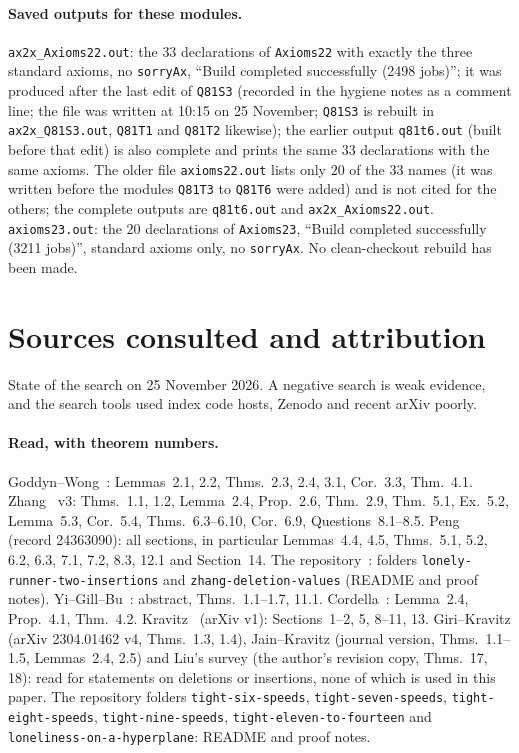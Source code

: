 \documentclass[11pt]{article}
\theoremstyle{definition}
\theoremstyle{remark}
\begin{document}
\paragraph{Saved outputs for these modules.}
\texttt{ax2x\_Axioms22.out}: the $33$ declarations of \texttt{Axioms22} with exactly the three standard axioms, no \texttt{sorryAx}, ``Build completed successfully (2498 jobs)''; it was produced after the last edit of \texttt{Q81S3} (recorded in the hygiene notes as a comment line; the file was written at 10:15 on 25 November; \texttt{Q81S3} is rebuilt in \texttt{ax2x\_Q81S3.out}, \texttt{Q81T1} and \texttt{Q81T2} likewise); the earlier output \texttt{q81t6.out} (built before that edit) is also complete and prints the same $33$ declarations with the same axioms. The older file \texttt{axioms22.out} lists only $20$ of the $33$ names (it was written before the modules \texttt{Q81T3} to \texttt{Q81T6} were added) and is not cited for the others; the complete outputs are \texttt{q81t6.out} and \texttt{ax2x\_Axioms22.out}. \texttt{axioms23.out}: the $20$ declarations of \texttt{Axioms23}, ``Build completed successfully (3211 jobs)'', standard axioms only, no \texttt{sorryAx}. No clean-checkout rebuild has been made.



\section{Sources consulted and attribution}\label{sec:prior}
State of the search on 25 November 2026. A negative search is weak evidence, and the search tools used index code hosts, Zenodo and recent arXiv poorly.

\paragraph{Read, with theorem numbers.}
{\sloppy Goddyn--Wong~\cite{GW}: Lemmas~2.1, 2.2, Thms.~2.3, 2.4, 3.1, Cor.~3.3, Thm.~4.1. Zhang~\cite{Z} v3: Thms.~1.1, 1.2, Lemma~2.4, Prop.~2.6, Thm.~2.9, Thm.~5.1, Ex.~5.2, Lemma~5.3, Cor.~5.4, Thms.~6.3--6.10, Cor.~6.9, Questions~8.1--8.5. Peng~\cite{P} (record 24363090): all sections, in particular Lemmas~4.4, 4.5, Thms.~5.1, 5.2, 6.2, 6.3, 7.1, 7.2, 8.3, 12.1 and Section~14. The repository~\cite{R1337}: folders \texttt{lonely-runner-two-insertions} and \texttt{zhang-deletion-values} (README and proof notes). Yi--Gill--Bu~\cite{YGB}: abstract, Thms.~1.1--1.7, 11.1. Cordella~\cite{C}: Lemma~2.4, Prop.~4.1, Thm.~4.2. Kravitz~\cite{K} (arXiv v1): Sections~1--2, 5, 8--11, 13. Giri--Kravitz (arXiv 2304.01462 v4, Thms.~1.3, 1.4), Jain--Kravitz (journal version, Thms.~1.1--1.5, Lemmas~2.4, 2.5) and Liu's survey (the author's revision copy, Thms.~17, 18): read for statements on deletions or insertions, none of which is used in this paper. The repository folders \texttt{tight-six-speeds}, \texttt{tight-seven-speeds}, \texttt{tight-eight-speeds}, \texttt{tight-nine-speeds}, \texttt{tight-eleven-to-fourteen} and \texttt{loneliness-on-a-hyperplane}: README and proof notes.\par}
\end{document}
